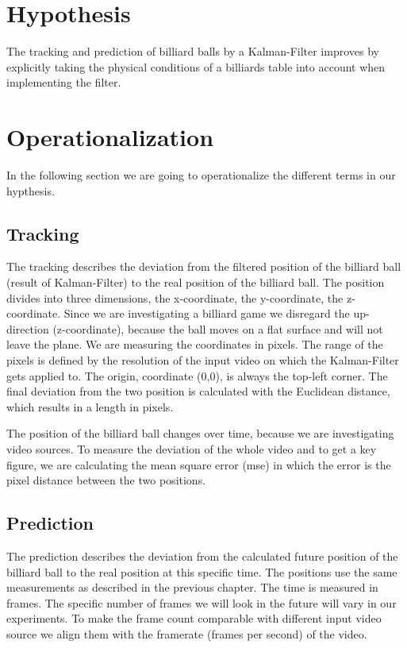 \documentclass[titlepage, a4paper, 11pt]{scrartcl}
\begin{document}
\section{Hypothesis}

The tracking and prediction of billiard balls by a Kalman-Filter improves by explicitly taking the physical conditions of a billiards table into account when implementing the filter.

\section{Operationalization}

In the following section we are going to operationalize the different terms in our hypthesis.

\subsection{Tracking}

The tracking describes the deviation from the filtered position of the billiard ball (result of Kalman-Filter) to the real position of the billiard ball.
The position divides into three dimensions, the x-coordinate, the y-coordinate, the z-coordinate.
Since we are investigating a billiard game we disregard the up-direction (z-coordinate), because the ball moves on a flat surface and will not leave the plane.
We are measuring the coordinates in pixels. The range of the pixels is defined by the resolution of the input video on which the Kalman-Filter gets applied to.
The origin, coordinate (0,0), is always the top-left corner.
The final deviation from the two position is calculated with the Euclidean distance, which results in a length in pixels.

The position of the billiard ball changes over time, because we are investigating video sources.
To measure the deviation of the whole video and to get a key figure, we are calculating the mean square error (mse) in which the error is the pixel distance between the two positions. 

\subsection{Prediction}

The prediction describes the deviation from the calculated future position of the billiard ball to the real position at this specific time.
The positions use the same measurements as described in the previous chapter.
The time is measured in frames. The specific number of frames we will look in the future will vary in our experiments.
To make the frame count comparable with different input video source we align them with the framerate (frames per second) of the video.
\end{document}
